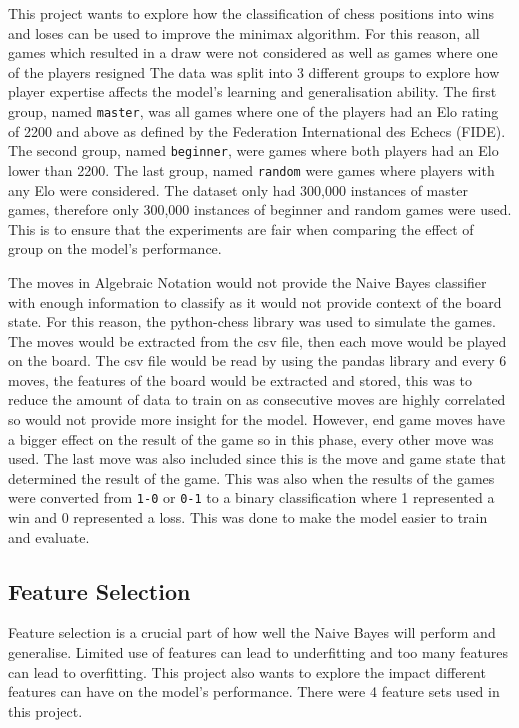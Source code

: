 This project wants to explore how the classification of chess positions into wins and loses can be used to improve the minimax algorithm. For this reason, all games which resulted in a draw were not considered as well as games where one of the players resigned The data was split into 3 different groups to explore how player expertise affects the model's learning and generalisation ability. The first group, named \texttt{master}, was all games where one of the players had an Elo rating of 2200 and above as defined by the Federation International des Echecs (FIDE). The second group, named \texttt{beginner}, were games where both players had an Elo lower than 2200. The last group, named \texttt{random} were games where players with any Elo were considered. The dataset only had 300,000 instances of master games, therefore only 300,000 instances of beginner and random games were used. This is to ensure that the experiments are fair when comparing the effect of group on the model's performance. 

The moves in Algebraic Notation would not provide the Naive Bayes classifier with enough information to classify as it would not provide context of the board state. For this reason, the python-chess library was used to simulate the games. The moves would be extracted from the csv file, then each move would be played on the board. The csv file would be read by using the pandas library and every 6 moves, the features of the board would be extracted and stored, this was to reduce the amount of data to train on as consecutive moves are highly correlated so would not provide more insight for the model. However, end game moves have a bigger effect on the result of the game so in this phase, every other move was used. The last move was also included since this is the move and game state that determined the result of the game. This was also when the results of the games were converted from \texttt{1-0} or \texttt{0-1} to a binary classification where 1 represented a win and 0 represented a loss. This was done to make the model easier to train and evaluate.

\subsection{Feature Selection}

Feature selection is a crucial part of how well the Naive Bayes will perform and generalise. Limited use of features can lead to underfitting and too many features can lead to overfitting. This project also wants to explore the impact different features can have on the model's performance. There were 4 feature sets used in this project. 

